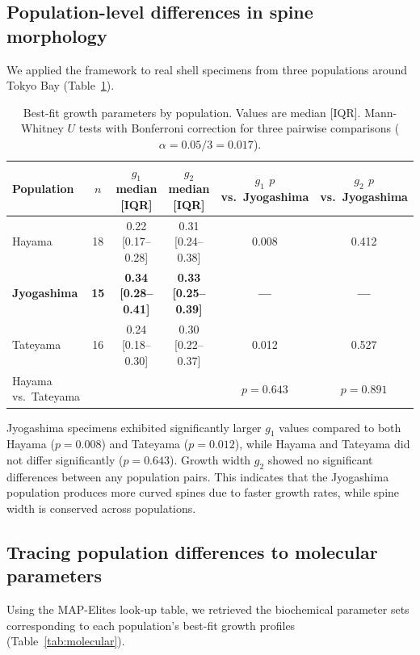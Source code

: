 \documentclass[11pt]{article}
\begin{document}
\subsection{Population-level differences in spine morphology}

We applied the framework to real shell specimens from three populations around Tokyo Bay (Table~\ref{tab:population}).

\begin{table}[H]
\centering
\caption{Best-fit growth parameters by population. Values are median [IQR]. Mann-Whitney $U$ tests with Bonferroni correction for three pairwise comparisons ($\alpha = 0.05/3 = 0.017$).}
\label{tab:population}
\begin{tabular}{lccccc}
\toprule
\textbf{Population} & \textbf{$n$} & \textbf{$g_1$ median [IQR]} & \textbf{$g_2$ median [IQR]} & \textbf{$g_1$ $p$ vs.\ Jyogashima} & \textbf{$g_2$ $p$ vs.\ Jyogashima} \\
\midrule
Hayama & 18 & 0.22 [0.17--0.28] & 0.31 [0.24--0.38] & 0.008 & 0.412 \\
\textbf{Jyogashima} & \textbf{15} & \textbf{0.34 [0.28--0.41]} & \textbf{0.33 [0.25--0.39]} & \textbf{---} & \textbf{---} \\
Tateyama & 16 & 0.24 [0.18--0.30] & 0.30 [0.22--0.37] & 0.012 & 0.527 \\
\midrule
Hayama vs.\ Tateyama & & & & $p = 0.643$ & $p = 0.891$ \\
\bottomrule
\end{tabular}
\end{table}

Jyogashima specimens exhibited significantly larger $g_1$ values compared to both Hayama ($p = 0.008$) and Tateyama ($p = 0.012$), while Hayama and Tateyama did not differ significantly ($p = 0.643$). Growth width $g_2$ showed no significant differences between any population pairs. This indicates that the Jyogashima population produces more curved spines due to faster growth rates, while spine width is conserved across populations.

\subsection{Tracing population differences to molecular parameters}

Using the MAP-Elites look-up table, we retrieved the biochemical parameter sets corresponding to each population's best-fit growth profiles (Table~\ref{tab:molecular}).
\end{document}
